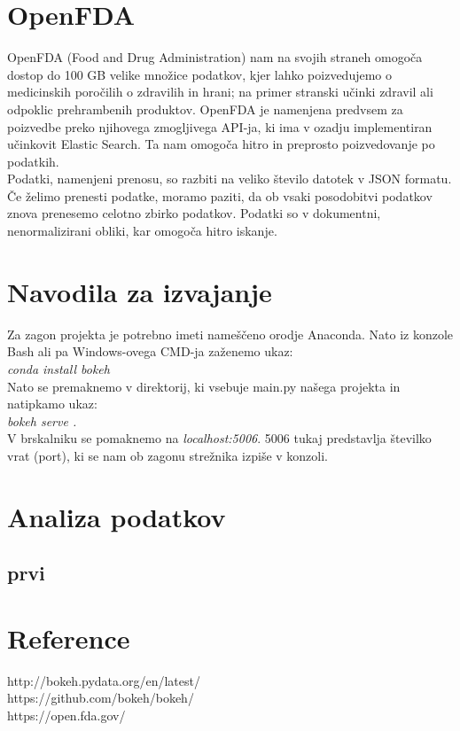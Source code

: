 \documentclass[a4paper,10pt]{article}
\begin{document}
\section{OpenFDA}
OpenFDA (Food and Drug Administration) nam na svojih straneh omogoča dostop do 100 GB velike množice podatkov, kjer lahko poizvedujemo o medicinskih poročilih o zdravilih in hrani; na primer stranski učinki zdravil ali odpoklic prehrambenih produktov. OpenFDA je namenjena predvsem za poizvedbe preko njihovega zmogljivega API-ja, ki ima v ozadju implementiran učinkovit Elastic Search. Ta nam omogoča hitro in preprosto poizvedovanje po podatkih. \\
Podatki, namenjeni prenosu, so razbiti na veliko število datotek v JSON formatu. Če želimo prenesti podatke, moramo paziti, da ob vsaki posodobitvi podatkov znova prenesemo celotno zbirko podatkov. Podatki so v dokumentni, nenormalizirani obliki, kar omogoča hitro iskanje.
\section{Navodila za izvajanje}
Za zagon projekta je potrebno imeti nameščeno orodje Anaconda. Nato iz konzole Bash ali pa Windows-ovega CMD-ja zaženemo ukaz: \\ \textit{conda install bokeh} \\
Nato se premaknemo v direktorij, ki vsebuje main.py našega projekta in natipkamo ukaz: \\ \textit{bokeh serve .} \\ V brskalniku se pomaknemo na \textit{localhost:5006}. 5006 tukaj predstavlja številko vrat (port), ki se nam ob zagonu strežnika izpiše v konzoli. 
\section{Analiza podatkov}
\subsection{prvi}


\section{Reference}
http://bokeh.pydata.org/en/latest/ \\
https://github.com/bokeh/bokeh/ \\
https://open.fda.gov/
\end{document}
